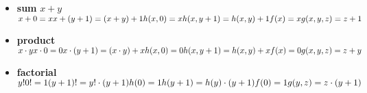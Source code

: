 \begin{example}
  \begin{itemize}
    \item \textbf{sum} $x+y$\\
      $x+0 = x\\
      x+(y+1) = (x+y)+1\\\\
      h(x,0) = x\\
      h(x,y+1) = h(x,y)+1\\\\
      f(x) = x\\
      g(x,y,z) = z+1$
    \item \textbf{product}
      $x\cdot y\\
      x\cdot 0 = 0\\
      x\cdot (y+1) = (x\cdot y)+x\\
      \\
      h(x,0) = 0\\
      h(x,y+1) = h(x,y)+x\\
      \\
      f(x) = 0\\
      g(x,y,z) = z+y$
    \item \textbf{factorial}
      $y!\\
      0! = 1\\
      (y+1)! = y!\cdot (y+1)\\
      \\
      h(0) = 1\\
      h(y+1) = h(y)\cdot(y+1)\\
      \\
      f(0) = 1\\
      g(y,z) = z\cdot (y+1)$
    \end{itemize}
  
\end{example}


